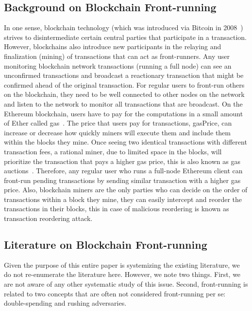 \subsection{Background on Blockchain Front-running} \label{sec:Front Running on the Blockchains}

In one sense, blockchain technology (which was introduced via Bitcoin in 2008~\cite{nakamoto2008bitcoin}) strives to disintermediate certain central parties that participate in a transaction. However, blockchains also introduce new participants in the relaying and finalization (\ie mining) of transactions that can act as front-runners. Any user monitoring blockchain network transactions (\eg running a full node) can see an unconfirmed transactions and broadcast a reactionary transaction that might be confirmed ahead of the original transaction. For regular users to front-run others on the blockchain, they need to be well connected to other nodes on the network and listen to the network to monitor all transactions that are broadcast. On the Ethereum blockchain, users have to pay for the computations in a small amount of Ether called \textsf{gas}~\cite{AccountT67:online}. The price that users pay for transactions, \textsf{gasPrice}, can increase or decrease how quickly miners will execute them and include them within the blocks they mine. Once seeing two identical transactions with different transaction fees, a rational miner, due to limited space in the blocks, will prioritize the transaction that pays a higher gas price, this is also known as gas auctions~\cite{frontrunme}. Therefore, any regular user who runs a full-node Ethereum client can front-run pending transactions by sending similar transaction with a higher gas price. Also, blockchain miners are the only parties who can decide on the order of transactions within a block they mine, they can easily intercept and reorder the transactions in their blocks, this in case of malicious reordering is known as \textsf{transaction reordering} attack.

\subsection{Literature on Blockchain Front-running}

Given the purpose of this entire paper is systemizing the existing literature, we do not re-enumerate the literature here. However, we note two things. First, we are not aware of any other systematic study of this issue. Second, front-running is related to two concepts that are often not considered front-running per se: double-spending and rushing adversaries. 

